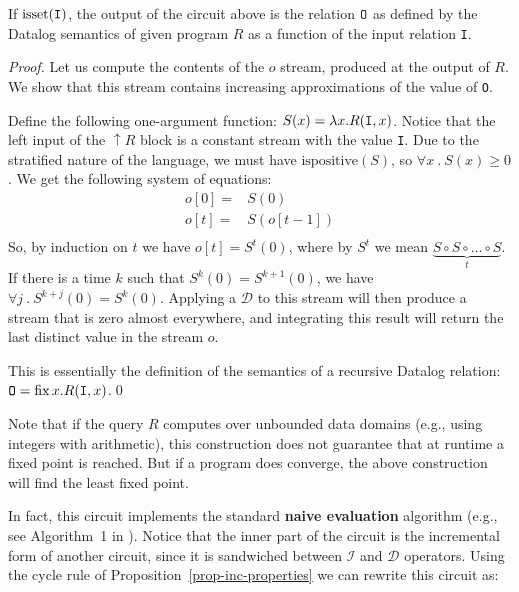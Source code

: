 \documentclass[twocolumn
]{svjour3}
\numberwithin{equation}{section}
\newcommand{\defined}[1]{\textbf{#1}\index{}}
\newcommand{\code}[1]{\mbox{\texttt{#1}}}
\newcommand{\zm}{\ensuremath{z^{-1}}} %
\newcommand{\I}{\mathcal{I}}  %
\newcommand{\D}{\mathcal{D}}  %
\newcommand{\I}{\mathit{I}}  %
\newcommand{\D}{\mathit{D}}  %
\newcommand{\inc}[1]{{#1}^{\Delta}}
\newcommand{\isset}{\mbox{isset}}
\newcommand{\ispositive}{\mbox{ispositive}}
\newcommand{\fix}[2]{\mbox{fix}\,#1.#2}
\newcommand{\lift}[1]{{\uparrow}#1}
\begin{document}
\begin{theorem}\label{theorem:recursion}
If $\isset(\code{I})$, the output of the circuit above is
the relation $\code{O}$ as defined by the Datalog semantics of given program
$R$ as a function of the input relation \code{I}.
\end{theorem}
\begin{proof}\label{proof-recursion}
Let us compute the contents of the $o$ stream, produced at the output
of $R$.  We show that this stream contains increasing approximations of the value of \code{O}.

Define the following one-argument function: $S(x) = \lambda x . R(\code{I}, x)$.
Notice that the left input of the $\lift{R}$ block is a constant stream
with the value \code{I}.  Due to the stratified nature of the language,
we must have $\ispositive(S)$, so $\forall x~.~S(x) \geq 0$.
We get the following system of equations:
$$
\begin{aligned}
o[0] =& S(0) \\
o[t] =& S(o[t-1]) \\
\end{aligned}
$$
So, by induction on $t$ we have $o[t] = S^t(0)$, where by
$S^t$ we mean $\underbrace{S \circ S \circ \ldots \circ S}_{t}$.
If there is a time $k$ such that $S^k(0) = S^{k+1}(0)$, we have
$\forall j~.~S^{k+j}(0) = S^k(0)$.  Applying a $\D$ to this stream
will then produce a stream that is zero almost everywhere, and integrating
this result will return the last distinct value in the stream $o$.

This is essentially the definition of the semantics of a recursive Datalog relation:
$\code{O} = \fix{x}{R(\code{I}, x)}$.\qed
\end{proof}

Note that if the query $R$ computes over unbounded data domains (e.g.,
using integers with arithmetic), this construction does not guarantee
that at runtime a fixed point is reached.  But if a program does converge, the
above construction will find the least fixed point.

In fact, this circuit implements the standard \defined{naive evaluation}
algorithm (e.g., see Algorithm~1 in \cite{greco-sldm15}).
Notice that the inner part of the circuit is the incremental
form of another circuit, since it is sandwiched between $\I$ and $\D$ operators.
Using the cycle rule of Proposition~\ref{prop-inc-properties} we can rewrite this circuit as:
%
\begin{center}
\end{center}
\end{document}
